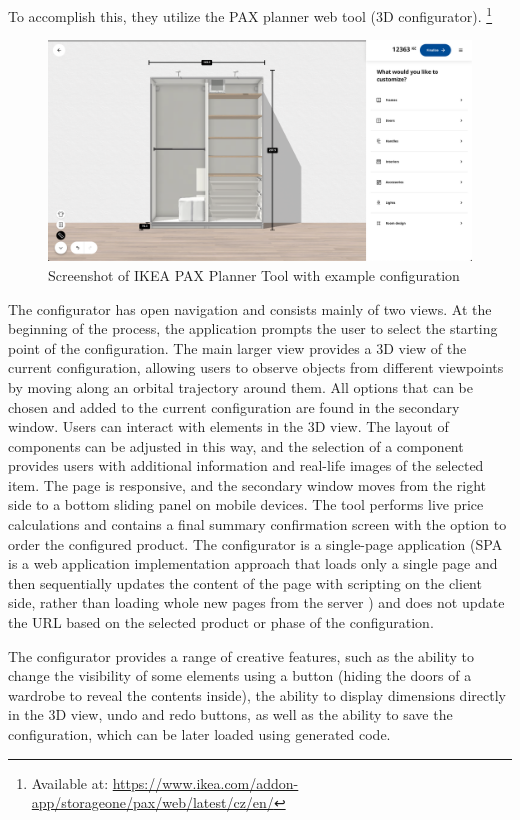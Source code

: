 To accomplish this, they utilize the PAX planner web tool (3D configurator). \footnote{Available at: \url{https://www.ikea.com/addon-app/storageone/pax/web/latest/cz/en/}} 

\begin{figure}[h]
\centering
\includegraphics[width=14cm]{images/analysis_ikea-pax.png}
\caption{Screenshot of IKEA PAX Planner Tool with example configuration}
\end{figure}

The configurator has open navigation and consists mainly of two views. At the beginning of the process, the application prompts the user to select the starting point of the configuration. The main larger view provides a 3D view of the current configuration, allowing users to observe objects from different viewpoints by moving along an orbital trajectory around them. All options that can be chosen and added to the current configuration are found in the secondary window. Users can interact with elements in the 3D view. The layout of components can be adjusted in this way, and the selection of a component provides users with additional information and real-life images of the selected item.
The page is responsive, and the secondary window moves from the right side to a bottom sliding panel on mobile devices.
The tool performs live price calculations and contains a final summary confirmation screen with the option to order the configured product. The configurator is a single-page application (SPA is a web application implementation approach that loads only a single page and then sequentially updates the content of the page with scripting on the client side, rather than loading whole new pages from the server \cite{Fink2014}) and does not update the URL based on the selected product or phase of the configuration.

The configurator provides a range of creative features, such as the ability to change the visibility of some elements using a button (hiding the doors of a wardrobe to reveal the contents inside), the ability to display dimensions directly in the 3D view, undo and redo buttons, as well as the ability to save the configuration, which can be later loaded using generated code.

